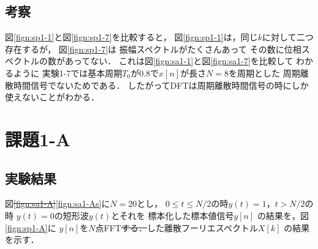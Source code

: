 \documentclass[11pt, a4paper, titlepage]{ltjsarticle}
\begin{document}
\subsection*{考察}
図\ref*{fign:sp1-1}と図\ref*{fign:sp1-7}を比較すると，
図\ref*{fign:sp1-1}は，同じ$k$に対して二つ存在するが，
図\ref*{fign:sp1-7}は
振幅スペクトルがたくさんあって
その数に位相スペクトルの数があってない．
これは図\ref*{fign:sa1-1}と図\ref*{fign:sa1-7}を比較して
わかるように
実験1-7では基本周期$T_{0}$が0.8で$x[n]$が長さ$N=8$を周期とした
周期離散時間信号でないためである．
したがってDFTは周期離散時間信号の時にしか使えないことがわかる．
\newpage
\section*{課題1-A}
\subsection*{実験結果}
図\sout{\ref*{fign:sa1-A}}\ref*{fign:sa1-As}に$N=20$とし，
$0\leq t \leq N/2$の時$y(t)=1$，$t>N/2$の時
$y(t)=0$の短形波$y(t)$とそれを
標本化した標本値信号$y[n]$
の結果を，図\ref*{fign:sp1-A}に
$y[n]$を$N$点FFT\sout{する．}した離散フーリエスペクトル$X[k]$
の結果を示す．
\end{document}
